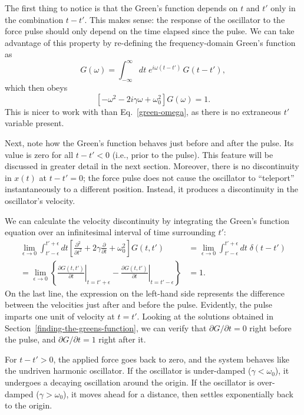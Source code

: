 \documentclass[10pt,a4paper]{article}
\begin{document}
The first thing to notice is that the Green's function depends on $t$
and $t'$ only in the combination $t-t'$. This makes sense: the
response of the oscillator to the force pulse should only depend on
the time elapsed since the pulse. We can take advantage of this
property by re-defining the frequency-domain Green's function as
\begin{equation}
G(\omega) = \int_{-\infty}^\infty dt \; e^{i\omega (t-t')}\, G(t-t'),
\end{equation}
which then obeys
\begin{equation}
\left[- \omega^2 - 2i \gamma\omega + \omega_0^2\right] G(\omega) = 1.
\end{equation}
This is nicer to work with than Eq.~\eqref{green-omega}, as there is
no extraneous $t'$ variable present.

Next, note how the Green's function behaves just before and after the
pulse. Its value is zero for all $t - t' < 0$ (i.e., prior to the
pulse). This feature will be discussed in greater detail in the next
section. Moreover, there is no discontinuity in $x(t)$ at $t - t' =
0$; the force pulse does not cause the oscillator to ``teleport''
instantaneously to a different position.  Instead, it produces a
discontinuity in the oscillator's velocity.

We can calculate the velocity discontinuity by integrating the Green's
function equation over an infinitesimal interval of time surrounding
$t'$:
\begin{align}
  \lim_{\epsilon \rightarrow 0} \int_{t'-\epsilon}^{t'+\epsilon} dt \left[\frac{\partial^2}{\partial t^2} + 2\gamma\frac{\partial}{\partial t} + \omega_0^2\right] G(t,t') &= \lim_{\epsilon \rightarrow 0} \int_{t'-\epsilon}^{t'+\epsilon} dt \; \delta(t-t') \\
  = \lim_{\epsilon \rightarrow 0} \left\{ \left.\frac{\partial G(t,t')}{\partial t}\right|_{t = t' +\epsilon} - \left.\frac{\partial G(t,t')}{\partial t}\right|_{t = t' - \epsilon}\right\} &= 1.
\end{align}
On the last line, the expression on the left-hand side represents the
difference between the velocities just after and before the
pulse. Evidently, the pulse imparts one unit of velocity at
$t=t'$. Looking at the solutions obtained in
Section~\ref{finding-the-greens-function}, we can verify that
$\partial G/\partial t = 0$ right before the pulse, and $\partial
G/\partial t = 1$ right after it.

For $t - t' > 0$, the applied force goes back to zero, and the system
behaves like the undriven harmonic oscillator. If the oscillator is
under-damped ($\gamma < \omega_0$), it undergoes a decaying
oscillation around the origin. If the oscillator is over-damped
($\gamma > \omega_0$), it moves ahead for a distance, then settles
exponentially back to the origin.
\end{document}
